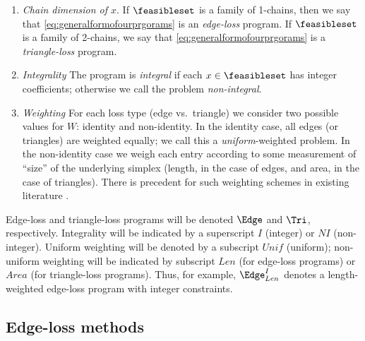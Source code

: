     \begin{enumerate}
        \item \emph{Chain dimension of $x$}.  If $\feasibleset$ is a family of 1-chains, then we say that \eqref{eq:generalformofourprgorams} is an \emph{edge-loss} program.  If $\feasibleset$ is a family of 2-chains, we say that \eqref{eq:generalformofourprgorams} is a \emph{triangle-loss} program.
        
        \item \emph{Integrality}  The program is \emph{integral} if each $x \in \feasibleset$ has integer coefficients; otherwise we call the problem \emph{non-integral}.
        
        \item \emph{Weighting}  For each loss type (edge vs.\ triangle) we consider two possible values for $W$: identity and non-identity.  In the identity case, all edges (or triangles) are weighted equally; we call this a \emph{uniform}-weighted problem.  In the non-identity case we weigh each entry according to some measurement of ``size'' of the underlying simplex (length, in the case of edges, and area, in the case of triangles).  There is precedent for such weighting schemes in existing literature \cite{dey2011optimal, chenquantifying}.
    \end{enumerate}

Edge-loss and triangle-loss programs will be denoted $\Edge$ and $\Tri$, respectively.  Integrality will be indicated by a superscript $I$ (integer) or $NI$ (non-integer).  Uniform weighting will be denoted by a subscript $Unif$ (uniform); non-uniform weighting will be indicated by subscript $Len$ (for edge-loss programs) or $Area$ (for triangle-loss programs).  Thus, for example, $\Edge^{I}_{Len}$ denotes a length-weighted edge-loss program with integer constraints.



\subsection{Edge-loss methods}
\label{sec:edgelossmethods}





